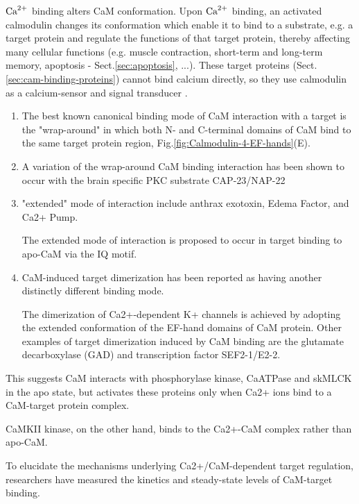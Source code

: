 ${\text{Ca}^{2+}}$ binding alters CaM conformation. Upon ${\text{Ca}^{2+}}$ binding, an activated
calmodulin changes its conformation which enable it to bind to a substrate, e.g.
a target protein and regulate the functions of that target protein, thereby
affecting many cellular functions (e.g. muscle contraction, short-term and
long-term memory, apoptosis - Sect.\ref{sec:apoptosis}, ...).
These target proteins (Sect.\ref{sec:cam-binding-proteins}) cannot bind calcium
directly, so they use calmodulin as a calcium-sensor and signal transducer
\citep{persechini1999}.


\begin{enumerate}
  \item  The best known canonical binding mode of CaM interaction with a
target is the "wrap-around" in which both N- and C-terminal domains of CaM bind
to the same target protein region, Fig.\ref{fig:Calmodulin-4-EF-hands}(E).

  \item A variation of the wrap-around CaM binding interaction has been shown to
  occur with the brain specific PKC substrate CAP-23/NAP-22 
  
  \item "extended" mode of interaction include anthrax exotoxin, Edema
  Factor, and Ca2+ Pump.

The extended mode of interaction is proposed to occur in target binding to
apo-CaM via the IQ motif.

  \item CaM-induced target dimerization has been reported as having another
  distinctly different binding mode. 

The dimerization of Ca2+-dependent K+ channels is achieved by adopting the
extended conformation of the EF-hand domains of CaM protein. Other examples of
target dimerization induced by CaM binding are the glutamate decarboxylase
(GAD) and transcription factor SEF2-1/E2-2.

\end{enumerate}

This suggests CaM interacts with phosphorylase kinase, CaATPase and skMLCK in
the apo state, but activates these proteins only when Ca2+ ions bind to a
CaM-target protein complex.

CaMKII kinase, on the other hand, binds to the Ca2+-CaM complex rather than
apo-CaM.

To elucidate the mechanisms underlying Ca2+/CaM-dependent target regulation,
researchers have measured the kinetics and steady-state levels of
CaM-target binding.

